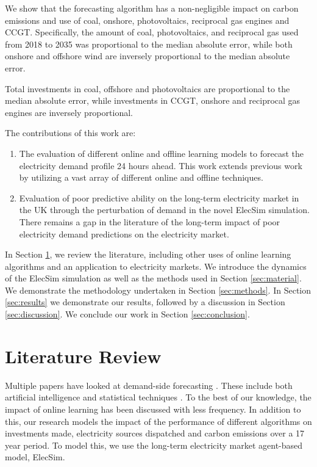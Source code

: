 \documentclass[final,3p,times,twocolumn,numbers]{elsarticle}
\begin{document}
We show that the forecasting algorithm has a non-negligible impact on carbon emissions and use of coal, onshore, photovoltaics, reciprocal gas engines and CCGT. Specifically, the amount of coal, photovoltaics, and reciprocal gas used from 2018 to 2035 was proportional to the median absolute error, while both onshore and offshore wind are inversely proportional to the median absolute error.

Total investments in coal, offshore and photovoltaics are proportional to the median absolute error, while investments in CCGT, onshore and reciprocal gas engines are inversely proportional.




The contributions of this work are:

\begin{enumerate}
  \item The evaluation of different online and offline learning models to forecast the electricity demand profile 24 hours ahead. This work extends previous work by utilizing a vast array of different online and offline techniques.
  \item Evaluation of poor predictive ability on the long-term electricity market in the UK through the perturbation of demand in the novel ElecSim simulation. There remains a gap in the literature of the long-term impact of poor electricity demand predictions on the electricity market.
\end{enumerate}


 


In Section \ref{sec:lit-review}, we review the literature, including other uses of online learning algorithms and an application to electricity markets. We introduce the dynamics of the ElecSim simulation as well as the methods used in Section \ref{sec:material}. We demonstrate the methodology undertaken in Section \ref{sec:methods}. In Section \ref{sec:results} we demonstrate our results, followed by a discussion in Section \ref{sec:discussion}. We conclude our work in Section \ref{sec:conclusion}.

\section{Literature Review}
\label{sec:lit-review}

Multiple papers have looked at demand-side forecasting \cite{Singh2012}. These include both artificial intelligence \cite{Kim2000, Tiong2008,Quilumba2014} and statistical techniques \cite{Huang2003,Nguyen2017}. To the best of our knowledge, the impact of online learning has been discussed with less frequency. In addition to this, our research models the impact of the performance of different algorithms on investments made, electricity sources dispatched and carbon emissions over a 17 year period. To model this, we use the long-term electricity market agent-based model, ElecSim.
\end{document}
